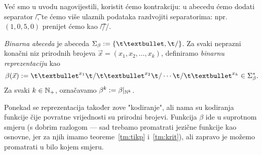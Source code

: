 
Već smo u uvodu nagovijestili, koristit ćemo kontrakciju: u abecedu ćemo dodati separator \t/, te ćemo više ulaznih podataka razdvojiti separatorima: npr.\ $(1,0,5,0)$ prenijet ćemo kao \t{\textbullet//\textbullet\textbullet\textbullet\textbullet\textbullet/}.

\begin{definicija}[{name=[binarna abeceda i binarna reprezentacija]}]\label{def:beta}
\emph{Binarna abeceda} je abeceda $\Sigma_\beta:=\{\t\textbullet,\t/\}$. Za svaki neprazni konačni niz prirodnih brojeva $\vec x=(x_1,x_2,\dotsc,x_k)$, definiramo \emph{binarnu reprezentaciju} kao
\begin{equation}\label{eq:betadef}
    \beta(\vec x):=\t\textbullet^{x_1}\t/\t\textbullet^{x_2}\t/\dotsm\t/\t\textbullet^{x_k}\in\Sigma_\beta^*\text.
\end{equation}
Za svaki $k\in{\mathbb N}_+$, označavamo $\beta^k:=\beta|_{{\mathbb N}^k}$.
\end{definicija}

Ponekad se reprezentacija također zove "kodiranje", ali nama su kodiranja funkcije čije povratne vrijednosti su prirodni brojevi. Funkcija $\beta$ ide u suprotnom smjeru (s dobrim razlogom --- sad trebamo promatrati jezične funkcije kao osnovne, jer za njih imamo teoreme~\ref{tm:tikp} i~\ref{tm:krit}), ali zapravo je možemo promatrati u bilo kojem smjeru.

